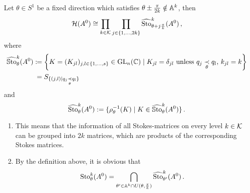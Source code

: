 \begin{thm}\label{thm:theoremForlargerDecomp}
  Let $\theta\in S^1$ be a fixed direction which satisfies
  $\theta\pm\frac{\pi}{2k}\notin\mathbb{A}^k$, then
  \[
    \mathcal{H}(A^0)\cong\prod_{k\in\mathcal{K}}\prod_{j\in\{1,\dots,2k\}}
    \widehat{\operatorname{Sto}}_{\theta+j\frac{\pi}{k}}^k(A^0) \,,
  \]
  where
  \begin{align*}
    \widehat{\operatorname{\mathbb{S}to}}_{\theta}^k(A^0)
    :\!\!&= \left\{K=(K_{jl})_{j,l\in\{1,\dots,s\}}\in\operatorname{GL}_n(\mathbb{C})\mid
        K_{jl}=\delta_{jl} \text{~unless~}
        q_j \underset{\theta}{\prec} q_l \text{, } k_{jl}=k\right\}
    \\&=S_{\{(j,l) \mid q_j \underset{\theta}{\prec} q_l \}}
  \end{align*}
  and
  \[
    \widehat{\operatorname{Sto}}_{\theta}^k(A^0):=\{\rho_\theta^{-1}(K)
      \mid K\in\widehat{\operatorname{\mathbb{S}to}}_{\theta}^k(A^0) \} \,.
  \]
  \begin{s-rem}
    \begin{enumerate}
      \item This means that the information of all Stokes-matrices on every
        level $k\in\mathcal{K}$ can be grouped into $2k$ matrices, which are products
        of the corresponding Stokes matrices.
      \item By the definition above, it is obvious that
        \[
          \operatorname{Sto}_{\theta}^k(A^0)=
          \bigcap_{\theta'\in \mathbb{A}^k\cap U(\theta,\frac{\pi}{k})}
          \widehat{\operatorname{Sto}}_{\theta'}^k(A^0) \,.
        \]
    \end{enumerate}
  \end{s-rem}
\end{thm}
